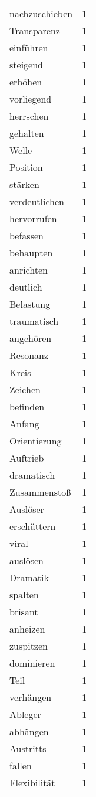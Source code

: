 \begin{tabular}{lr}
nachzuschieben & 1 \\
Transparenz & 1 \\
einführen & 1 \\
steigend & 1 \\
erhöhen & 1 \\
vorliegend & 1 \\
herrschen & 1 \\
gehalten & 1 \\
Welle & 1 \\
Position & 1 \\
stärken & 1 \\
verdeutlichen & 1 \\
hervorrufen & 1 \\
befassen & 1 \\
behaupten & 1 \\
anrichten & 1 \\
deutlich & 1 \\
Belastung & 1 \\
traumatisch & 1 \\
angehören & 1 \\
Resonanz & 1 \\
Kreis & 1 \\
Zeichen & 1 \\
befinden & 1 \\
Anfang & 1 \\
Orientierung & 1 \\
Auftrieb & 1 \\
dramatisch & 1 \\
Zusammenstoß & 1 \\
Auslöser & 1 \\
erschüttern & 1 \\
viral & 1 \\
auslösen & 1 \\
Dramatik & 1 \\
spalten & 1 \\
brisant & 1 \\
anheizen & 1 \\
zuspitzen & 1 \\
dominieren & 1 \\
Teil & 1 \\
verhängen & 1 \\
Ableger & 1 \\
abhängen & 1 \\
Austritts & 1 \\
fallen & 1 \\
Flexibilität & 1 \\

\end{tabular}
